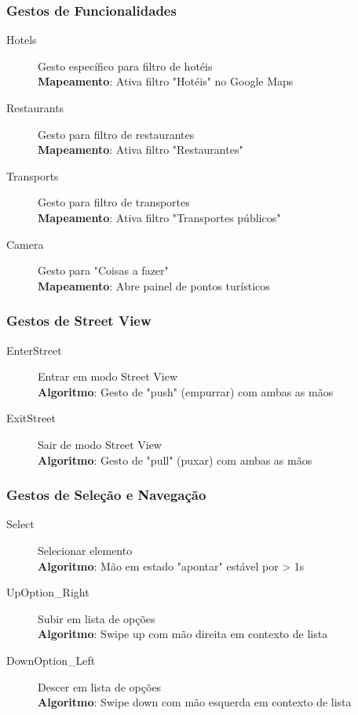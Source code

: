 \subsubsection{Gestos de Funcionalidades}

\begin{description}
    \item[Hotels] Gesto específico para filtro de hotéis \\
    \textbf{Mapeamento}: Ativa filtro "Hotéis" no Google Maps

    \item[Restaurants] Gesto para filtro de restaurantes \\
    \textbf{Mapeamento}: Ativa filtro "Restaurantes"

    \item[Transports] Gesto para filtro de transportes \\
    \textbf{Mapeamento}: Ativa filtro "Transportes públicos"

    \item[Camera] Gesto para "Coisas a fazer" \\
    \textbf{Mapeamento}: Abre painel de pontos turísticos
\end{description}

\subsubsection{Gestos de Street View}

\begin{description}
    \item[EnterStreet] Entrar em modo Street View \\
    \textbf{Algoritmo}: Gesto de "push" (empurrar) com ambas as mãos

    \item[ExitStreet] Sair de modo Street View \\
    \textbf{Algoritmo}: Gesto de "pull" (puxar) com ambas as mãos
\end{description}

\subsubsection{Gestos de Seleção e Navegação}

\begin{description}
    \item[Select] Selecionar elemento \\
    \textbf{Algoritmo}: Mão em estado "apontar" estável por > 1s

    \item[UpOption\_Right] Subir em lista de opções \\
    \textbf{Algoritmo}: Swipe up com mão direita em contexto de lista

    \item[DownOption\_Left] Descer em lista de opções \\
    \textbf{Algoritmo}: Swipe down com mão esquerda em contexto de lista
\end{description}

